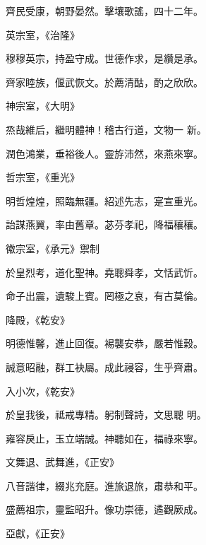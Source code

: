 \begin{pinyinscope}
 齊民受康，朝野晏然。擊壤歌謠，四十二年。



 英宗室，《治隆》



 穆穆英宗，持盈守成。世德作求，是纘是承。



 齊家睦族，偃武恢文。於薦清酤，酌之欣欣。



 神宗室，《大明》



 烝哉維后，繼明體神！稽古行道，文物一
 新。



 潤色鴻業，垂裕後人。靈斿沛然，來燕來寧。



 哲宗室，《重光》



 明哲煌煌，照臨無疆。紹述先志，寔宣重光。



 詒謀燕翼，率由舊章。苾芬孝祀，降福穰穰。



 徽宗室，《承元》禦制



 於皇烈考，道化聖神。堯聰舜孝，文恬武忻。



 命子出震，遺駿上賓。罔極之哀，有古莫倫。



 降殿，《乾安》



 明德惟馨，進止回復。裼襲安恭，嚴若惟穀。



 誠意昭融，群工袂屬。成此祲容，生乎齊肅。



 入小次，《乾安》



 於皇我後，祗戒專精。躬制聲詩，文思聰
 明。



 雍容戾止，玉立端誠。神聽如在，福祿來寧。



 文舞退、武舞進，《正安》



 八音諧律，綴兆充庭。進旅退旅，肅恭和平。



 盛薦祖宗，靈監昭升。像功崇德，遹觀厥成。



 亞獻，《正安》




\end{pinyinscope}
